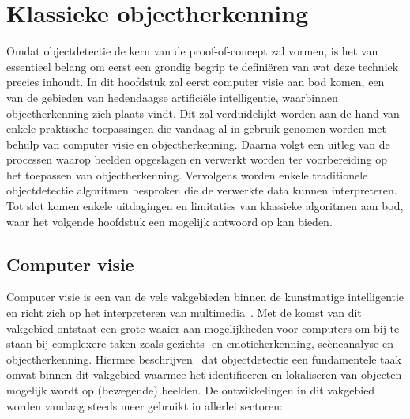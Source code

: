 

\section{Klassieke objectherkenning}\label{sec:ls-object-detectie}
Omdat objectdetectie de kern van de proof-of-concept zal vormen, is het van essentieel belang om eerst een grondig begrip te defini\"eren van wat deze techniek precies inhoudt.
In dit hoofdstuk zal eerst computer visie aan bod komen, een van de gebieden van hedendaagse artifici\"ele intelligentie, waarbinnen objectherkenning zich plaats vindt.
Dit zal verduidelijkt worden aan de hand van enkele praktische toepassingen die vandaag al in gebruik genomen worden met behulp van computer visie en objectherkenning.
Daarna volgt een uitleg van de processen waarop beelden opgeslagen en verwerkt worden ter voorbereiding op het toepassen van objectherkenning.
Vervolgens worden enkele traditionele objectdetectie algoritmen besproken die de verwerkte data kunnen interpreteren.
Tot slot komen enkele uitdagingen en limitaties van klassieke algoritmen aan bod, waar het volgende hoofdstuk een mogelijk antwoord op kan bieden.


\subsection{Computer visie}\label{subsec:de-kern-van-objectdetectie}
Computer visie is een van de vele vakgebieden binnen de kunstmatige intelligentie en richt zich op het interpreteren van multimedia~\autocite{Moin2023}.
Met de komst van dit vakgebied ontstaat een grote waaier aan mogelijkheden voor computers om bij te staan bij complexere taken zoals gezichts- en emotieherkenning, sc\`eneanalyse en objectherkenning.
Hiermee beschrijven~\textcite{Tasnim2023} dat objectdetectie een fundamentele taak omvat binnen dit vakgebied waarmee het identificeren en lokaliseren van objecten mogelijk wordt op (bewegende) beelden.
De ontwikkelingen in dit vakgebied worden vandaag steeds meer gebruikt in allerlei sectoren:

